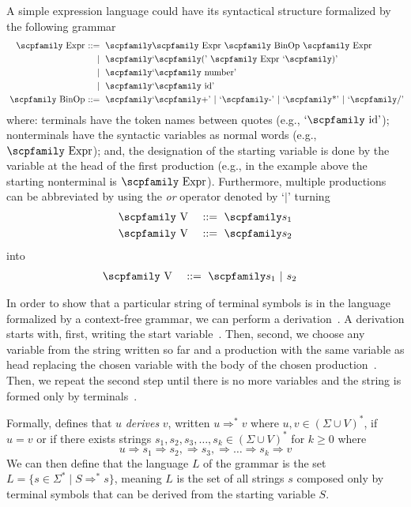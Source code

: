 \documentclass[
  oneside,
  english,
  coorientadorbanca,
  noabntexcite
]{ufsc-thesis-rn46-2019}
\def\bnfdef{::=}
\newcommand{\codett}[1]{\text{\scpfamily#1}}
\newcommand{\code}[1]{\text{\scpfamily\setlength\spaceskip{0.35em}#1}}
\newcommand{\bnfvar}[1]{\codett{#1}}
\newcommand{\bnfter}[1]{\textrm{`}\codett{#1}\textrm{'}}
\newcommand{\bnfor}[1]{{$\mid$} #1}
\newcommand{\bnfprod}[2]{\bnfvar{#1} & \ & \bnfdef{} & \ \code{#2}}
\newcommand{\bnfmore}[1]{            & \ & \mid{}    & \ \code{#1}}
\begin{document}
A simple expression language could have its syntactical structure formalized by the following grammar
\begin{equation}~\label{eq:ambiguous_expr_grammar}
  \begin{alignedat}{2}
    \bnfprod{Expr}{\bnfvar{Expr} \bnfvar{BinOp} \bnfvar{Expr}} \\
    \bnfmore{\bnfter{(} \bnfvar{Expr} \bnfter{)}}               \\
    \bnfmore{\bnfter{number}}                                     \\
    \bnfmore{\bnfter{id}}                                         \\
    \bnfprod{BinOp}{\bnfter{+} \bnfor{\bnfter{-}} \bnfor{\bnfter{*}} \bnfor{\bnfter{/}}}
  \end{alignedat}
\end{equation}
where: terminals have the token names between quotes (e.g., $\bnfter{id}$);
nonterminals have the syntactic variables as normal words (e.g., $\bnfvar{Expr}$);
and, the designation of the starting variable is done by the variable at the head of the first production (e.g., in the example above the starting nonterminal is $\bnfvar{Expr}$).
Furthermore, multiple productions can be abbreviated by using the \textit{or} operator denoted by `$\mid$' turning
\begin{alignat}{2}
  \bnfprod{V}{$s_1$} \nonumber \\
  \bnfprod{V}{$s_2$} \nonumber
\end{alignat}
into
\begin{alignat}{2}
  \bnfprod{V}{$s_1$ \bnfor{$s_2$}} \nonumber
\end{alignat}

In order to show that a particular string of terminal symbols is in the language formalized by a context-free grammar, we can perform a derivation~\cite{sipser2012introduction}.
A derivation starts with, first, writing the start variable~\cite{sipser2012introduction}.
Then, second, we choose any variable from the string written so far and a production with the same variable as head replacing the chosen variable with the body of the chosen production~\cite{sipser2012introduction}.
Then, we repeat the second step until there is no more variables and the string is formed only by terminals~\cite{sipser2012introduction}.

Formally, \textcite{sipser2012introduction} defines that $u$ \textit{derives} $v$, written $u \Rightarrow^* v$ where $u, v \in {(\Sigma \cup V)}^*$, if $u = v$ or if there exists strings $s_1, s_2, s_3, \dots, s_k \in {(\Sigma \cup V)}^*$ for $k \geq 0$ where
\begin{equation*}
  u \Rightarrow s_1 \Rightarrow  s_2, \Rightarrow s_3, \Rightarrow \dots \Rightarrow s_k \Rightarrow v
\end{equation*}
We can then define that the language $L$ of the grammar is the set $L = \{s \in \Sigma^* \mid S \Rightarrow^* s\}$, meaning $L$ is the set of all strings $s$ composed only by terminal symbols that can be derived from the starting variable $S$.
\end{document}
